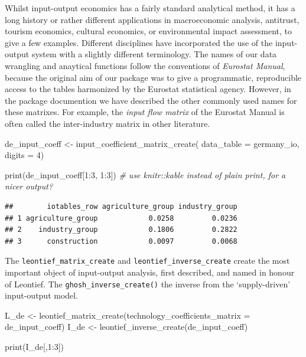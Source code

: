 \documentclass[
]{article}
\newenvironment{Shaded}{\begin{snugshade}}{\end{snugshade}}
\newcommand{\AttributeTok}[1]{\textcolor[rgb]{0.77,0.63,0.00}{#1}}
\newcommand{\CommentTok}[1]{\textcolor[rgb]{0.56,0.35,0.01}{\textit{#1}}}
\newcommand{\DecValTok}[1]{\textcolor[rgb]{0.00,0.00,0.81}{#1}}
\newcommand{\FunctionTok}[1]{\textcolor[rgb]{0.00,0.00,0.00}{#1}}
\newcommand{\NormalTok}[1]{#1}
\newcommand{\OtherTok}[1]{\textcolor[rgb]{0.56,0.35,0.01}{#1}}
\newcommand{\SpecialCharTok}[1]{\textcolor[rgb]{0.00,0.00,0.00}{#1}}
\begin{document}
Whilst input-output economics has a fairly standard analytical method,
it has a long history or rather different applications in macroeconomic
analysis, antitrust, tourism economics, cultural economics, or
environmental impact assessment, to give a few examples. Different
disciplines have incorporated the use of the input-output system with a
slightly different terminology. The names of our data wrangling and
anaytical functions follow the conventions of \emph{Eurostat Manual},
because the original aim of our package was to give a programmatic,
reproducible access to the tables harmonized by the Eurostat statistical
agency. However, in the package documention we have described the other
commonly used names for these matrixes. For example, the \emph{input
flow matrix} of the Eurostat Manual is often called the inter-industry
matrix in other literature.

\begin{Shaded}
\begin{Highlighting}[]
\NormalTok{de\_input\_coeff }\OtherTok{\textless{}{-}} \FunctionTok{input\_coefficient\_matrix\_create}\NormalTok{( }
     \AttributeTok{data\_table =}\NormalTok{ germany\_io, }
     \AttributeTok{digits =} \DecValTok{4}\NormalTok{)}

\FunctionTok{print}\NormalTok{(de\_input\_coeff[}\DecValTok{1}\SpecialCharTok{:}\DecValTok{3}\NormalTok{, }\DecValTok{1}\SpecialCharTok{:}\DecValTok{3}\NormalTok{]) }\CommentTok{\# use knitr::kable instead of plain print, for a nicer output?}
\end{Highlighting}
\end{Shaded}

\begin{verbatim}
##        iotables_row agriculture_group industry_group
## 1 agriculture_group            0.0258         0.0236
## 2    industry_group            0.1806         0.2822
## 3      construction            0.0097         0.0068
\end{verbatim}

The \texttt{leontief\_matrix\_create} and
\texttt{leontief\_inverse\_create} create the most important object of
input-output analysis, first described, and named in honour of Leontief.
The \texttt{ghosh\_inverse\_create()} the inverse from the
`supply-driven' input-output model.

\begin{Shaded}
\begin{Highlighting}[]
\NormalTok{L\_de }\OtherTok{\textless{}{-}} \FunctionTok{leontief\_matrix\_create}\NormalTok{(}\AttributeTok{technology\_coefficients\_matrix =}\NormalTok{ de\_input\_coeff)}
\NormalTok{I\_de }\OtherTok{\textless{}{-}} \FunctionTok{leontief\_inverse\_create}\NormalTok{(de\_input\_coeff)}

\FunctionTok{print}\NormalTok{(I\_de[,}\DecValTok{1}\SpecialCharTok{:}\DecValTok{3}\NormalTok{])}
\end{Highlighting}
\end{Shaded}
\end{document}
